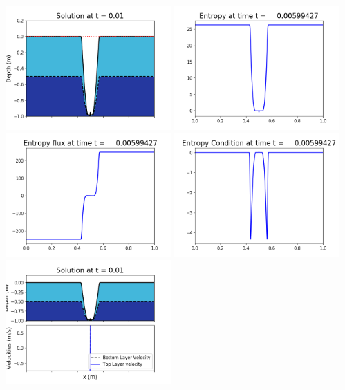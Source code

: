 \documentclass[11pt]{article}
\begin{document}
\includegraphics[width=0.475\textwidth]{frame0038fig1006.png}
\vskip 10pt 
\includegraphics[width=0.475\textwidth]{frame0038fig1007.png}
\includegraphics[width=0.475\textwidth]{frame0038fig1008.png}
\vskip 10pt 
\includegraphics[width=0.475\textwidth]{frame0038fig1009.png}
\vskip 10pt 
\includegraphics[width=0.475\textwidth]{frame0039fig1001.png}
\end{document}
